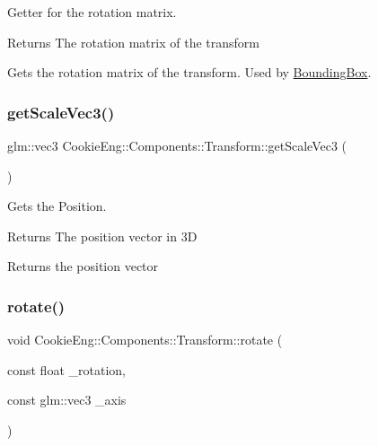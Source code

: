Getter for the rotation matrix. 

\begin{DoxyReturn}{Returns}
The rotation matrix of the transform
\end{DoxyReturn}
Gets the rotation matrix of the transform. Used by \hyperlink{class_cookie_eng_1_1_components_1_1_bounding_box}{Bounding\+Box}. \mbox{\label{class_cookie_eng_1_1_components_1_1_transform_a8ed85d55bd1084dde196ceb1b16fa736}} 
\subsubsection{\texorpdfstring{get\+Scale\+Vec3()}{getScaleVec3()}}
{\footnotesize\ttfamily glm\+::vec3 Cookie\+Eng\+::\+Components\+::\+Transform\+::get\+Scale\+Vec3 (\begin{DoxyParamCaption}{ }\end{DoxyParamCaption})\hspace{0.3cm}{\ttfamily [inline]}}



Gets the Position. 

\begin{DoxyReturn}{Returns}
The position vector in 3D
\end{DoxyReturn}
Returns the position vector \mbox{\label{class_cookie_eng_1_1_components_1_1_transform_a061b3b2b5d33c1dda2955e9b2e01d736}} 
\subsubsection{\texorpdfstring{rotate()}{rotate()}}
{\footnotesize\ttfamily void Cookie\+Eng\+::\+Components\+::\+Transform\+::rotate (\begin{DoxyParamCaption}\item[{const float}]{\+\_\+rotation,  }\item[{const glm\+::vec3}]{\+\_\+axis }\end{DoxyParamCaption})}



